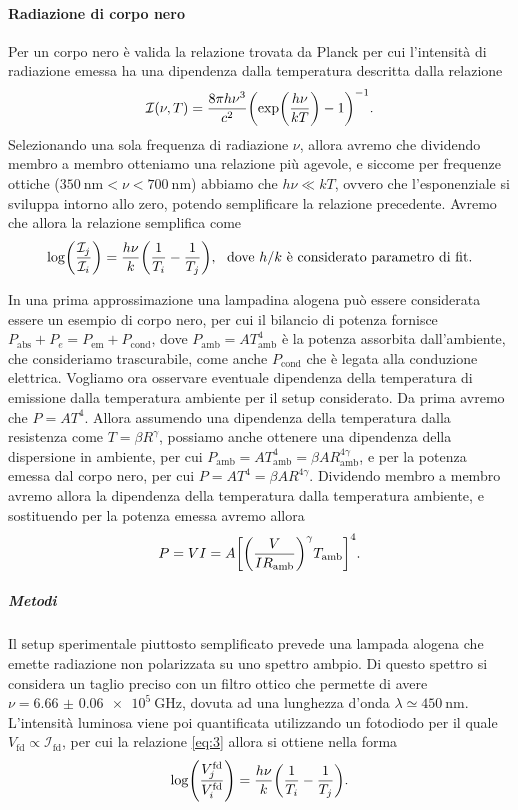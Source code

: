 \documentclass[a4paper, varvw, nofootinbib]{revtex4-2}
\begin{document}
\paragraph*{Radiazione di corpo nero} Per un corpo nero è valida la relazione trovata da Planck per cui l'intensità di radiazione emessa ha una dipendenza dalla temperatura descritta dalla relazione \begin{equation} \mathcal I(\nu, T) = \frac{8 \pi h \nu^3}{c^2}\qty(\exp(\frac{h\nu}{kT})-1)^{-1}.  \end{equation} Selezionando una sola frequenza di radiazione $\nu$, allora avremo che dividendo membro a membro otteniamo una relazione più agevole, e siccome per frequenze ottiche ($\SI{350}{\nano\metre} < \nu <\SI{700}{\nano\metre}$) abbiamo che $h\nu \ll kT$, ovvero che l'esponenziale si sviluppa intorno allo zero, potendo semplificare la relazione precedente. Avremo che allora la relazione semplifica come \begin{equation} \log(\frac{\mathcal I_j}{\mathcal I_i}) = \frac{h\nu}{k}\qty({1\over T_i} - {1\over T_j}),~\text{ dove $h/k$ è considerato parametro di fit.} \label{eq:3}\end{equation}

In una prima approssimazione una lampadina alogena può essere considerata essere un esempio di corpo nero, per cui il bilancio di potenza fornisce $P_\text{abs} + P_e = P_\text{em} + P_\text{cond}$, dove $P_\text{amb} = AT_\text{amb}^4$ è la potenza assorbita dall'ambiente, che consideriamo trascurabile, come anche $P_\text{cond}$ che è legata alla conduzione elettrica. 
Vogliamo ora osservare eventuale dipendenza della temperatura di emissione dalla temperatura ambiente per il setup considerato. Da prima avremo che $P = AT^4$.  Allora assumendo una dipendenza della temperatura dalla resistenza come $T = \beta R^\gamma$, possiamo anche ottenere una dipendenza della dispersione in ambiente, per cui $P_\text{amb} = AT_\text{amb}^4 = \beta A R^{4\gamma}_\text{amb}$, e per la potenza emessa dal corpo nero, per cui $P = AT^4 = \beta A R^{4\gamma}$. Dividendo membro a membro avremo allora la dipendenza della temperatura dalla temperatura ambiente, e sostituendo per la potenza emessa avremo allora \begin{equation} P = VI =  A \qty[\qty(\frac{V}{IR_\text{amb}})^\gamma T_\text{amb}]^4.\label{eq:4} \end{equation} 

\subparagraph*{Metodi}\label{sec:black_body_methods} Il setup sperimentale piuttosto semplificato prevede una lampada alogena che emette radiazione non polarizzata su uno spettro ambpio. Di questo spettro si considera un taglio preciso con un filtro ottico che permette di avere $\nu = \SI{6.66(6)e+5}{\giga\hertz}$, dovuta ad una lunghezza d'onda $\lambda \simeq \SI{450}{\nano\metre}$. L'intensità luminosa viene poi quantificata utilizzando un fotodiodo per il quale $V_\text{fd} \propto \mathcal I_\text{fd}$, per cui la relazione \eqref{eq:3} allora si ottiene nella forma \begin{equation} \log(\frac{V^\text{fd}_j}{V^\text{fd}_i}) = \frac{h\nu}{k}\qty({1\over T_i} - {1\over T_j}). \end{equation}
\end{document}
